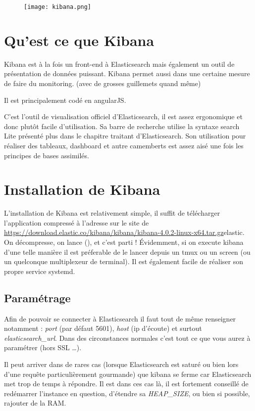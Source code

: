 \begin{figure}[H]
\center
\texttt{[image: kibana.png]}
\label{fig:kibana.png}
\end{figure}
\section{Qu'est ce que Kibana}
Kibana est à la fois un front-end à Elasticsearch mais également un outil de présentation
de données puissant. Kibana permet aussi dans une certaine mesure de faire du monitoring.
(avec de grosses guillemets quand même)

Il est principalement codé en angularJS.

C'est l'outil de visualisation officiel d'Elasticsearch, il est assez ergonomique 
et donc plutôt facile d'utilisation. Sa barre de recherche utilise la syntaxe 
search Lite présenté plus dans le chapitre traitant d'Elasticsearch.
Son utilisation pour réaliser des tableaux, dashboard et autre camemberts est assez
aisé une fois les principes de bases assimilés.

\section{Installation de Kibana}
L'installation de Kibana est relativement simple, il suffit de télécharger l'application
compressé à l'adresse sur le site de \url{https://download.elastic.co/kibana/kibana/kibana-4.0.2-linux-x64.tar.gz}{elastic}.
On décompresse, on lance (), et c'est parti !
Évidemment, si on execute kibana d'une telle manière il est préferable de le lancer
depuis un tmux ou un screen (ou un quelconque multiplexeur de terminal). Il est 
également facile de réaliser son propre service systemd.

\subsection{Paramétrage}
Afin de pouvoir se connecter à Elasticsearch il faut tout de même renseigner 
 notamment : \emph{port} (par défaut 5601), \emph{host} (ip d'écoute)
et surtout \emph{elasticsearch\_url}.
Dans des circonstances normales c'est tout ce que vous aurez à paramétrer (hors 
SSL \ldots{}).

Il peut arriver dans de rares cas (lorsque Elasticsearch est saturé ou bien lors 
d'une requête particulièrement gourmande) que kibana se ferme car Elasticsearch met
trop de temps à répondre. Il est dans ces cas là, il est fortement conseillé de 
redémarrer l'instance en question, d'étendre sa \emph{HEAP\_SIZE}, ou bien si possible, 
rajouter de la RAM.

